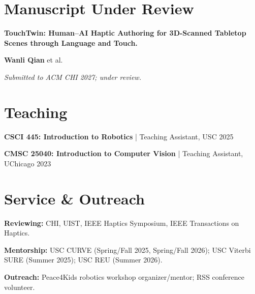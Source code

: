 \documentclass[11pt,letterpaper]{article}
\newcommand{\pub}[3]{\textbf{#1}\par #2\par #3\par\vspace{7pt}}
\begin{document}
\section*{Manuscript Under Review}
\pub{TouchTwin: Human--AI Haptic Authoring for 3D-Scanned Tabletop Scenes through Language and Touch.}{\textbf{Wanli Qian} et al.}{\textit{Submitted to ACM CHI 2027; under review.}}

\section*{Teaching}
\textbf{CSCI 445: Introduction to Robotics} | Teaching Assistant, USC \hfill 2025\par
\vspace{3pt}
\textbf{CMSC 25040: Introduction to Computer Vision} | Teaching Assistant, UChicago \hfill 2023\par
\section*{Service \& Outreach}
\textbf{Reviewing:} CHI, UIST, IEEE Haptics Symposium, IEEE Transactions on Haptics.\par
\vspace{3pt}
\textbf{Mentorship:} USC CURVE (Spring/Fall 2025, Spring/Fall 2026); USC Viterbi SURE (Summer 2025); USC REU (Summer 2026).\par
\vspace{3pt}
\textbf{Outreach:} Peace4Kids robotics workshop organizer/mentor; RSS conference volunteer.\par
\end{document}
